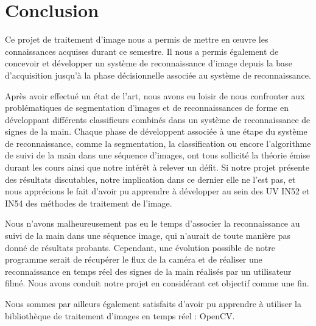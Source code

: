 \section*{Conclusion}
Ce projet de traitement d’image nous a permis de mettre en œuvre les connaissances acquises durant ce semestre. Il nous a permis également de concevoir et développer un système de reconnaissance d’image depuis la base d’acquisition jusqu’à la phase décisionnelle associée au système de reconnaissance. 

Après avoir effectué un état de l’art, nous avons eu loisir de nous confronter aux problématiques de segmentation d’images et de reconnaissances de forme en développant différents classifieurs combinés dans un système de reconnaissance de signes de la main. Chaque phase de développent associée à une étape du système de reconnaissance, comme la segmentation, la classification ou encore l’algorithme de suivi de la main dans une séquence d’images, ont tous sollicité la théorie émise durant les cours ainsi que notre intérêt à relever un défit. Si notre projet présente des résultats discutables, notre implication dans ce dernier elle ne l’est pas, et nous apprécions le fait d’avoir pu apprendre à développer au sein des UV IN52 et IN54 des méthodes de traitement de l’image.

Nous n’avons malheureusement pas eu le temps d’associer la reconnaissance au suivi de la main dans une séquence image, qui n’aurait de toute manière pas donné de résultats probants. Cependant, une évolution possible de notre programme serait de récupérer le flux de la caméra et de réaliser une reconnaissance en temps réel des signes de la main réalisés par un utilisateur filmé. Nous avons conduit notre projet en considérant cet objectif comme une fin.

Nous sommes par ailleurs également satisfaits d’avoir pu apprendre à utiliser la bibliothèque de traitement d’images en temps réel : OpenCV.
